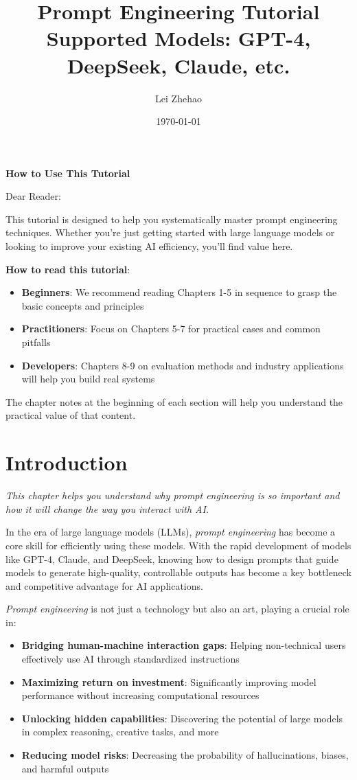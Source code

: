 \documentclass[12pt]{article}
\title{Prompt Engineering Tutorial\\
\large Supported Models: GPT-4, DeepSeek, Claude, etc.}
\author{Lei Zhehao}
\date{\today}
\newcommand{\chapternote}[1]{\textit{\small #1}}
\begin{document}
\maketitle

\begin{center}
\large\textbf{How to Use This Tutorial}
\end{center}

\noindent Dear Reader:

This tutorial is designed to help you systematically master prompt engineering techniques. Whether you're just getting started with large language models or looking to improve your existing AI efficiency, you'll find value here.

\textbf{How to read this tutorial}:
\begin{itemize}
  \item \textbf{Beginners}: We recommend reading Chapters 1-5 in sequence to grasp the basic concepts and principles
  \item \textbf{Practitioners}: Focus on Chapters 5-7 for practical cases and common pitfalls
  \item \textbf{Developers}: Chapters 8-9 on evaluation methods and industry applications will help you build real systems
\end{itemize}

The chapter notes at the beginning of each section will help you understand the practical value of that content.

\tableofcontents
\newpage

\section{Introduction}
\chapternote{This chapter helps you understand why prompt engineering is so important and how it will change the way you interact with AI.}

In the era of large language models (LLMs), \emph{prompt engineering} has become a core skill for efficiently using these models. With the rapid development of models like GPT-4, Claude, and DeepSeek, knowing how to design prompts that guide models to generate high-quality, controllable outputs has become a key bottleneck and competitive advantage for AI applications.

\emph{Prompt engineering} is not just a technology but also an art, playing a crucial role in:
\begin{itemize}
  \item \textbf{Bridging human-machine interaction gaps}: Helping non-technical users effectively use AI through standardized instructions
  \item \textbf{Maximizing return on investment}: Significantly improving model performance without increasing computational resources
  \item \textbf{Unlocking hidden capabilities}: Discovering the potential of large models in complex reasoning, creative tasks, and more
  \item \textbf{Reducing model risks}: Decreasing the probability of hallucinations, biases, and harmful outputs
\end{itemize}
\end{document}
